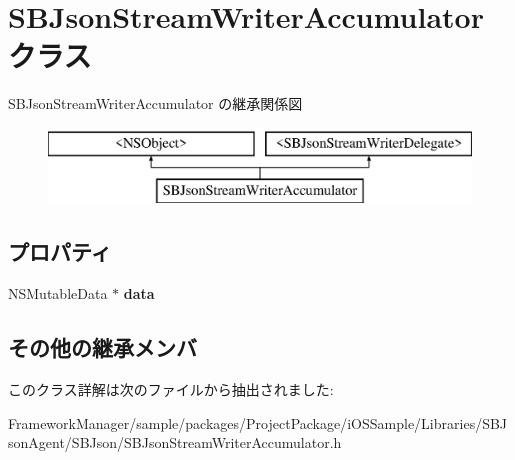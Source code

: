 \hypertarget{interface_s_b_json_stream_writer_accumulator}{}\section{S\+B\+Json\+Stream\+Writer\+Accumulator クラス}
\label{interface_s_b_json_stream_writer_accumulator}
S\+B\+Json\+Stream\+Writer\+Accumulator の継承関係図\begin{figure}[H]
\begin{center}
\leavevmode
\includegraphics[height=2.000000cm]{interface_s_b_json_stream_writer_accumulator}
\end{center}
\end{figure}
\subsection*{プロパティ}
\begin{DoxyCompactItemize}
\item 
\hypertarget{interface_s_b_json_stream_writer_accumulator_a21f8d0b93b372f25bd79b05558c04b1d}{}N\+S\+Mutable\+Data $\ast$ {\bfseries data}\label{interface_s_b_json_stream_writer_accumulator_a21f8d0b93b372f25bd79b05558c04b1d}

\end{DoxyCompactItemize}
\subsection*{その他の継承メンバ}


このクラス詳解は次のファイルから抽出されました\+:\begin{DoxyCompactItemize}
\item 
Framework\+Manager/sample/packages/\+Project\+Package/i\+O\+S\+Sample/\+Libraries/\+S\+B\+Json\+Agent/\+S\+B\+Json/S\+B\+Json\+Stream\+Writer\+Accumulator.\+h\end{DoxyCompactItemize}
